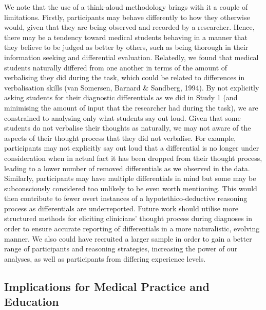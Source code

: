 \documentclass[a4paper, nobind]{templates/ociamthesis}
\begin{document}
We note that the use of a think-aloud methodology brings with it a couple of limitations. Firstly, participants may behave differently to how they otherwise would, given that they are being observed and recorded by a researcher. Hence, there may be a tendency toward medical students behaving in a manner that they believe to be judged as better by others, such as being thorough in their information seeking and differential evaluation. Relatedly, we found that medical students naturally differed from one another in terms of the amount of verbalising they did during the task, which could be related to differences in verbalisation skills (van Somersen, Barnard \& Sandberg, 1994). By not explicitly asking students for their diagnostic differentials as we did in Study 1 (and minimising the amount of input that the researcher had during the task), we are constrained to analysing only what students say out loud. Given that some students do not verbalise their thoughts as naturally, we may not aware of the aspects of their thought process that they did not verbalise. For example, participants may not explicitly say out loud that a differential is no longer under consideration when in actual fact it has been dropped from their thought process, leading to a lower number of removed differentials as we observed in the data. Similarly, participants may have multiple differentials in mind but some may be subconsciously considered too unlikely to be even worth mentioning. This would then contribute to fewer overt instances of a hypotethico-deductive reasoning process as differentials are underreported. Future work should utilise more structured methods for eliciting clinicians' thought process during diagnoses in order to ensure accurate reporting of differentials in a more naturalistic, evolving manner. We also could have recruited a larger sample in order to gain a better range of participants and reasoning strategies, increasing the power of our analyses, as well as participants from differing experience levels.

\hypertarget{implications-for-medical-practice-and-education}{%
\subsection*{Implications for Medical Practice and Education}\label{implications-for-medical-practice-and-education}}
\end{document}
